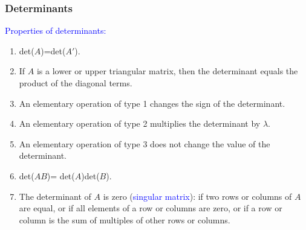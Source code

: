 \documentclass[11pt,aspectratio=169]{beamer}
\begin{document}
\begin{frame}
\frametitle{Determinants}
\begin{small}
\textcolor{blue}{Properties of determinants:}
\begin{enumerate}
\item det($A$)=det($A'$).

\item If $A$ is a lower or upper triangular matrix, then the determinant equals the product of the diagonal terms.


\item An elementary operation of type 1 changes the sign of the determinant.

\item An elementary operation of type 2 multiplies the determinant by $\lambda$.

\item An elementary operation of type 3 does not change the value of the determinant.



\item  det($AB$)= det($A$)det($B$).

\item The determinant of $A$ is zero (\textcolor{blue}{singular matrix}): if two rows or columns of $A$ are equal, or if all elements of a row or columns are zero, or if a row or column is the sum of multiples of other rows or columns.

\end{enumerate}

\end{small}
\end{frame}
\end{document}
